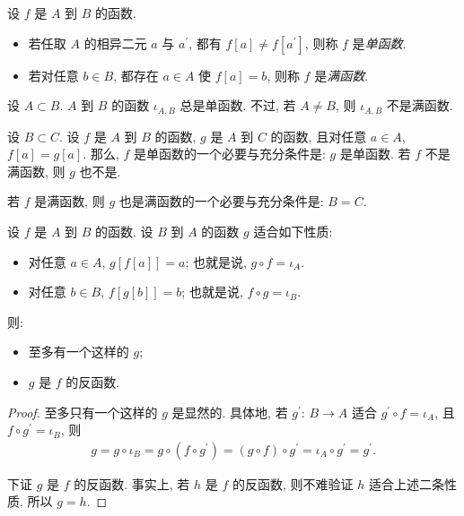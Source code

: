 \begin{definition}
    设 $f$ 是 $A$ 到 $B$ 的函数.
    \begin{itemize}
        \item 若任取 $A$ 的相异二元 $a$ 与 $a^{\prime}$, 都有 $f[a] \neq f[a^{\prime}]$, 则称 $f$ 是\emph{单函数}.
        \item 若对任意 $b \in B$, 都存在 $a \in A$ 使 $f[a] = b$, 则称 $f$ 是\emph{满函数}.
    \end{itemize}
\end{definition}

\begin{example}
    设 $A \subset B$. $A$ 到 $B$ 的函数 $\iota_{A,B}$ 总是单函数. 不过, 若 $A \neq B$, 则 $\iota_{A,B}$ 不是满函数.
\end{example}

\begin{remark}
    设 $B \subset C$. 设 $f$ 是 $A$ 到 $B$ 的函数, $g$ 是 $A$ 到 $C$ 的函数, 且对任意 $a \in A$, $f[a] = g[a]$. 那么, $f$ 是单函数的一个必要与充分条件是: $g$ 是单函数. 若 $f$ 不是满函数, 则 $g$ 也不是.

    若 $f$ 是满函数, 则 $g$ 也是满函数的一个必要与充分条件是: $B = C$.
\end{remark}

\begin{theorem}
    设 $f$ 是 $A$ 到 $B$ 的函数. 设 $B$ 到 $A$ 的函数 $g$ 适合如下性质:
    \begin{itemize}
        \item 对任意 $a \in A$, $g[f[a]] = a$; 也就是说, $g \circ f = \iota_A$.
        \item 对任意 $b \in B$, $f[g[b]] = b$; 也就是说, $f \circ g = \iota_B$.
    \end{itemize}
    则:
    \begin{itemize}
        \item 至多有一个这样的 $g$;
        \item $g$ 是 $f$ 的反函数.
    \end{itemize}
\end{theorem}

\begin{proof}
    至多只有一个这样的 $g$ 是显然的. 具体地, 若 $g^{\prime}$: $B \to A$ 适合 $g^{\prime} \circ f = \iota_A$, 且 $f \circ g^{\prime} = \iota_B$, 则
    \begin{align*}
        g = g \circ \iota_B = g \circ (f \circ g^{\prime}) = (g \circ f) \circ g^{\prime} = \iota_A \circ g^{\prime} = g^{\prime}.
    \end{align*}

    下证 $g$ 是 $f$ 的反函数. 事实上, 若 $h$ 是 $f$ 的反函数, 则不难验证 $h$ 适合上述二条性质. 所以 $g = h$.
\end{proof}

